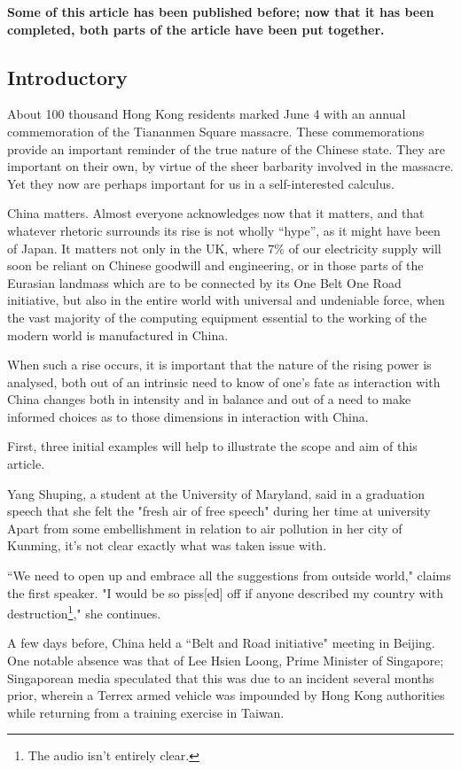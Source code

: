 \textbf{Some of this article has been published before; now that it has been completed, both parts of the article have been put together.}

\subsection{Introductory}


	About 100 thousand Hong Kong residents marked June 4 with an annual commemoration of the Tiananmen Square massacre. These commemorations provide an important reminder of the true nature of the Chinese state. They are important on their own, by virtue of the sheer barbarity involved in the massacre. Yet they now are perhaps important for us in a self-interested calculus.

	China matters. Almost everyone acknowledges now that it matters, and that whatever rhetoric surrounds its rise is not wholly ``hype'', as it might have been of Japan. It matters not only in the UK, where $7\%$ of our electricity supply will soon be reliant on Chinese goodwill and engineering, or in those parts of the Eurasian landmass which are to be connected by its One Belt One Road initiative, but also in the entire world with universal and undeniable force, when the vast majority of the computing equipment essential to the working of the modern world is manufactured in China.

	When such a rise occurs, it is important that the nature of the rising power is analysed, both out of an intrinsic need to know of one's fate as interaction with China changes both in intensity and in balance and out of a need to make informed choices as to those dimensions in interaction with China.

	First, three initial examples will help to illustrate the scope and aim of this article.

	Yang Shuping, a student at the University of Maryland, said in a graduation speech that she felt the "fresh air of free speech" during her time at university Apart from some embellishment in relation to air pollution in her city of Kunming, it's not clear exactly what was taken issue with.

	``We need to open up and embrace all the suggestions from outside world," claims the first speaker. "I would be so piss[ed] off if anyone described my country with destruction\footnote{The audio isn't entirely clear.}," she continues.

	A few days before, China held a ``Belt and Road initiative" meeting in Beijing. One notable absence was that of Lee Hsien Loong, Prime Minister of Singapore; Singaporean media speculated that this was due to an incident several months prior, wherein a Terrex armed vehicle was impounded by Hong Kong authorities while returning from a training exercise in Taiwan.

